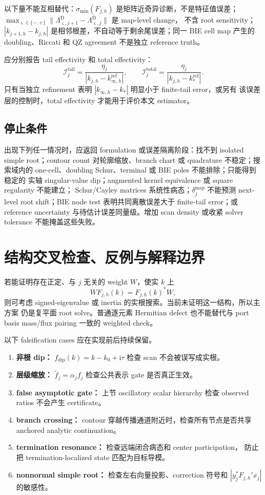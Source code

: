 \documentclass[UTF8,fontset=fandol,11pt,a4paper]{ctexart}
\begin{document}
以下量不能互相替代：$\sigma_{\min}(F_{j,h})$ 是矩阵近奇异诊断，不是特征值误差；
$\max_{\varsigma\in\{-,+\}}
\|\Lambda_{\varsigma,j+1}^{\mathrm D}-\Lambda_{\varsigma,j}^{\mathrm D}\|$ 是 map-level change，
不含 root sensitivity；
$|k_{j+1,h}-k_{j,h}|$ 是相邻根差，不自动等于剩余尾误差；同一 BIE cell map 产生的
doubling、Riccati 和 QZ agreement 不是独立 reference truth。

应分别报告 tail effectivity 和 total effectivity：
\[
  \mathcal I_j^{\mathrm{tail}}
  =\frac{\eta_j}{|k_{j,h}-k_{\infty,h}^{\mathrm{ref}}|},
  \qquad
  \mathcal I_j^{\mathrm{total}}
  =\frac{\eta_j}{|k_{j,h}-k_*^{\mathrm{ref}}|}.
\]
只有当独立 refinement 表明 $|k_{\infty,h}-k_*|$ 明显小于 finite-tail error，或另有
该误差层的控制时，total effectivity 才能用于评价本文 estimator。

\subsection{停止条件}

出现下列任一情况时，应返回 formulation 或误差隔离阶段：找不到 isolated simple
root；contour count 对轮廓缩放、branch chart 或 quadrature 不稳定；搜索域内的
one-cell、doubling Schur、terminal 或 BIE poles 不能排除；只能得到稳定的
实轴 singular-value dip；augmented kernel equivalence 或 square regularity 不能建立；
Schur/Cayley matrices 系统性病态；$\delta_j^{\mathrm{map}}$ 不能预测 next-level root
shift；BIE node test 表明共同离散误差大于 finite-tail error；或 reference uncertainty
与待估计误差同量级。增加 scan density 或收紧 solver tolerance 不能掩盖这些失败。

\section{结构交叉检查、反例与解释边界}

若能证明存在正定、与 $j$ 无关的 weight $W$，使实 $k$ 上
\[
  WF_{j,h}(k)=F_{j,h}(k)^*W,
\]
则可考虑 signed-eigenvalue 或 inertia 的实根搜索。当前未证明这一结构，所以主方案
仍是复平面 root solve。普通逐元素 Hermitian defect 也不能替代与 port basis
mass/flux pairing 一致的 weighted check。

以下 falsification cases 应在实现前后持续保留。
\begin{enumerate}
  \item \textbf{非根 dip：} $f_{\mathrm{dip}}(k)=k-k_0+\mathrm{i}\tau$ 检查 scan 不会被误写成实根。
  \item \textbf{层级缩放：} $\widetilde f_j=\alpha_jf_j$ 检查公共表示 gate 是否真正生效。
  \item \textbf{false asymptotic gate：} 上节 oscillatory scalar hierarchy 检查 observed
  ratios 不会产生 certificate。
  \item \textbf{branch crossing：} contour 穿越传播通道附近时，检查所有节点是否共享
  anchored analytic continuation。
  \item \textbf{termination resonance：} 检查远端闭合病态和 center participation，
  防止把 termination-localized state 匹配为目标导模。
  \item \textbf{nonnormal simple root：} 检查左右向量投影、correction 符号和
  $|y_j^*F_{j,h}'x_j|$ 的敏感性。
\end{enumerate}
\end{document}

